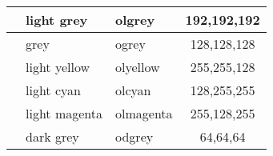 \documentclass[
	a4paper,
	parskip=half,
    pagesize=auto,      		%
    listof=totoc,   		%
    bibliography=totoc,
	11pt
]{scrartcl}
\begin{document}
\begin{table}[H]
\begin{tabular}{|l|l|l|c|}
\cellcolor[RGB]{192,192,192} & light grey    & olgrey                  & 192,192,192    \\ \hline
\cellcolor[RGB]{128,128,128} & grey          & ogrey                   & 128,128,128    \\ \hline
\cellcolor[RGB]{255,255,128} & light yellow  & olyellow                & 255,255,128    \\ \hline
\cellcolor[RGB]{128,255,255} & light cyan    & olcyan                  & 128,255,255    \\ \hline
\cellcolor[RGB]{255,128,255} & light magenta & olmagenta               & 255,128,255    \\ \hline
\cellcolor[RGB]{64,64,64} & dark grey     & odgrey                  & 64,64,64    \\ \hline
\end{tabular}
\end{table}










    \cleardoublepage
    
    

\end{document}
